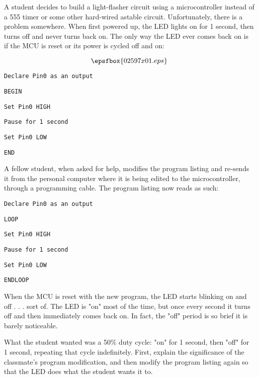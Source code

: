 

A student decides to build a light-flasher circuit using a microcontroller instead of a 555 timer or some other hard-wired astable circuit.  Unfortunately, there is a problem somewhere.  When first powered up, the LED lights on for 1 second, then turns off and never turns back on.  The only way the LED ever comes back on is if the MCU is reset or its power is cycled off and on:

$$\epsfbox{02597x01.eps}$$

\noindent
{}

{\tt Declare Pin0 as an output}

{\tt BEGIN}

\hskip 10pt {\tt Set Pin0 HIGH}

\hskip 10pt {\tt Pause for 1 second}

\hskip 10pt {\tt Set Pin0 LOW}

{\tt END}

\vskip 10pt

A fellow student, when asked for help, modifies the program listing and re-sends it from the personal computer where it is being edited to the microcontroller, through a programming cable.  The program listing now reads as such:

\vskip 10pt

\noindent
{}

{\tt Declare Pin0 as an output}

{\tt LOOP}

\hskip 10pt {\tt Set Pin0 HIGH}

\hskip 10pt {\tt Pause for 1 second}

\hskip 10pt {\tt Set Pin0 LOW}

{\tt ENDLOOP}

\vskip 10pt

When the MCU is reset with the new program, the LED starts blinking on and off . . . sort of.  The LED is "on" most of the time, but once every second it turns off and then immediately comes back on.  In fact, the "off" period is so brief it is barely noticeable.  

What the student wanted was a 50\% duty cycle: "on" for 1 second, then "off" for 1 second, repeating that cycle indefinitely.  First, explain the significance of the classmate's program modification, and then modify the program listing again so that the LED does what the student wants it to.

